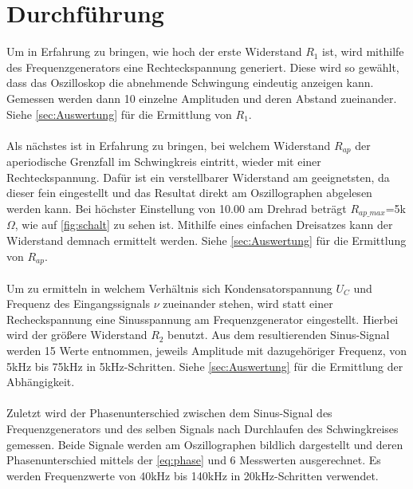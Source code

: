 \section{Durchführung}
\label{sec:Durchführung}

Um in Erfahrung zu bringen, wie hoch der erste Widerstand \(R_1\) ist, wird mithilfe des Frequenzgenerators eine Rechteckspannung generiert.
Diese wird so gewählt, dass das Oszilloskop die abnehmende Schwingung eindeutig anzeigen kann.
Gemessen werden dann 10 einzelne Amplituden und deren Abstand zueinander.
Siehe \autoref{sec:Auswertung} für die Ermittlung von \(R_1\).
\\\\
Als nächstes ist in Erfahrung zu bringen, bei welchem Widerstand \(R_{ap}\) der aperiodische Grenzfall im Schwingkreis eintritt, wieder mit einer Rechteckspannung.
Dafür ist ein verstellbarer Widerstand am geeignetsten, da dieser fein eingestellt und das Resultat direkt am Oszillographen abgelesen werden kann.
Bei höchster Einstellung von 10.00 am Drehrad beträgt \(R_{ap\_max}\)=5k\(\Omega\), wie auf \autoref{fig:schalt} zu sehen ist. Mithilfe eines einfachen Dreisatzes kann der Widerstand demnach ermittelt werden.
Siehe \autoref{sec:Auswertung} für die Ermittlung von \(R_{ap}\).
\\\\
Um zu ermitteln in welchem Verhältnis sich Kondensatorspannung \(U_C\) und Frequenz des Eingangssignals \(\nu\) zueinander stehen, wird statt einer Recheckspannung eine Sinusspannung am Frequenzgenerator eingestellt.
Hierbei wird der größere Widerstand \(R_2\) benutzt.
Aus dem resultierenden Sinus-Signal werden 15 Werte entnommen, jeweils Amplitude mit dazugehöriger Frequenz, von 5kHz bis 75kHz in 5kHz-Schritten.
Siehe \autoref{sec:Auswertung} für die Ermittlung der Abhängigkeit. 
\\\\
Zuletzt wird der Phasenunterschied zwischen dem Sinus-Signal des Frequenzgenerators und des selben Signals nach Durchlaufen des Schwingkreises gemessen.
Beide Signale werden am Oszillographen bildlich dargestellt und deren Phasenunterschied mittels der \autoref{eq:phase} und 6 Messwerten ausgerechnet.
Es werden Frequenzwerte von 40kHz bis 140kHz in 20kHz-Schritten verwendet.